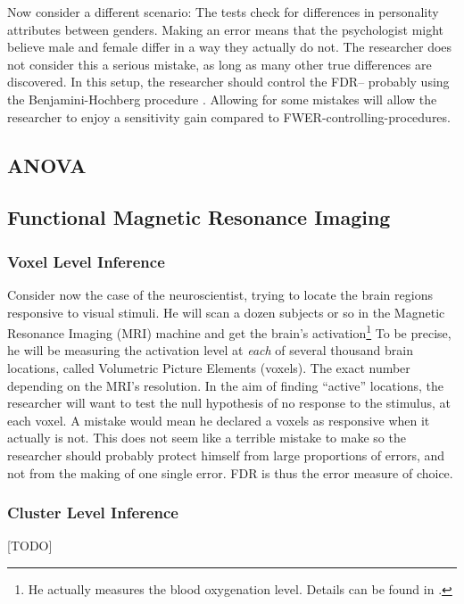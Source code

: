 \documentclass[draft,12pt]{article}
\begin{document}
Now consider a different scenario: The tests check for differences in personality attributes between genders. Making an error means that the psychologist might believe male and female differ in a way they actually do not. The researcher does not consider this a serious mistake, as long as many other true differences are discovered. In this setup, the researcher should control the FDR-- probably using the Benjamini-Hochberg procedure \citep{benjamini_controlling_1995}. Allowing for some mistakes will allow the researcher to enjoy a sensitivity gain compared to FWER-controlling-procedures.


\subsection{ANOVA}



\subsection{Functional Magnetic Resonance Imaging}
\subsubsection{Voxel Level Inference}
Consider now the case of the neuroscientist, trying to locate the brain regions responsive to visual stimuli. He will scan a dozen subjects or so in the Magnetic Resonance Imaging (MRI) machine and get the brain's activation\footnote{ He actually measures the blood oxygenation level. Details can be found in \cite{lazar_statistical_2008}.} To be precise, he will be measuring the activation level at \emph{each} of several thousand brain locations, called Volumetric Picture Elements (voxels). The exact number depending on the MRI's resolution. 
In the aim of finding ``active'' locations, the researcher will want to test the null hypothesis of no response to the stimulus, at each voxel. A mistake would mean he declared a voxels as responsive when it actually is not. This does not seem like a terrible mistake to make so the researcher should probably protect himself from large proportions of errors, and not from the making of one single error. FDR is thus the error measure of choice.


\subsubsection{Cluster Level Inference}
[TODO]
\end{document}

